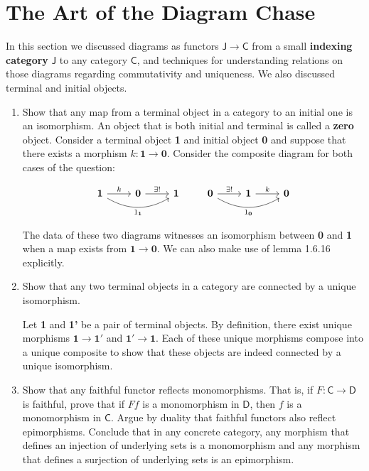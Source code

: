 \documentclass[10pt, oneside]{article}   	%
\newcommand{\cat}[1]{\bm{ \mathsf{#1} }}
\newcommand{\cc}{\cat{C}}
\newcommand{\dd}{\cat{D}}
\begin{document}
\section{The Art of the Diagram Chase}

In this section we discussed diagrams as functors $\cat{J} \to \cc$ from a small \textbf{indexing category} $\cat{J}$ to any category $\cc$, and techniques for understanding relations on those diagrams regarding commutativity and uniqueness. We also discussed terminal and initial objects. 

\begin{enumerate}[i]
	\item Show that any map from a terminal object in a category to an initial one is an isomorphism. An object that is both initial and terminal is called a \textbf{zero} object.
	\linebreak
	Consider a terminal object \textbf{1} and initial object \textbf{0} and suppose that there exists a morphism $k : \mathbf{1} \to \mathbf{0}$. Consider the composite diagram for both cases of the question: 
	
	\[
	\begin{aligned}
		\begin{tikzcd}
			\mathbf{1} \ar[r, "k"] \ar[rr, "1_{\mathbf{1}}", bend right, swap] & \mathbf{0} \ar[r, "\exists !"] & \mathbf{1}
		\end{tikzcd}
		\qquad
		\begin{tikzcd}
			\mathbf{0} \ar[r, "\exists !"] \ar[rr, "1_{\mathbf{0}}", bend right, swap] & \mathbf{1} \ar[r, "k"] & \mathbf{0}
		\end{tikzcd}
	\end{aligned}
	\]
	
	The data of these two diagrams witnesses an isomorphism between \textbf{0} and \textbf{1} when a map exists from $\mathbf{1} \to \mathbf{0}$. We can also make use of lemma 1.6.16 explicitly.

	\item Show that any two terminal objects in a category are connected by a unique isomorphism.
	
	Let \textbf{1} and \textbf{1'} be a pair of terminal objects. By definition, there exist unique morphisms $\mathbf{1} \to \mathbf{1'}$ and $\mathbf{1'} \to \mathbf{1}$. Each of these unique morphisms compose into a unique composite to show that these objects are indeed connected by a unique isomorphism.
	
	\item Show that any faithful functor reflects monomorphisms. That is, if $F : \cc \to \dd$ is faithful, prove that if $Ff$ is a monomorphism in $\dd$, then $f$ is a monomorphism in $\cc$. Argue by duality that faithful functors also reflect epimorphisms. Conclude that in any concrete category, any morphism that defines an injection of underlying sets is a monomorphism and any morphism that defines a surjection of underlying sets is an epimorphism.
	

\end{enumerate}
\end{document}
